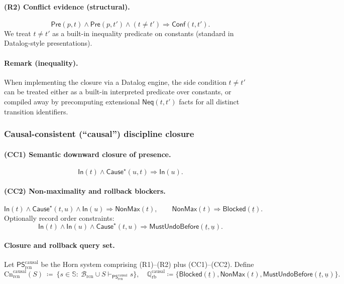 \documentclass[twoside]{article}
\newcommand{\Cn}{\mathrm{Cn}}
\newcommand{\1}{\mathbf{1}}
\begin{document}
\paragraph{(R2) Conflict evidence (structural).}
\[
\mathsf{Pre}(p,t)\wedge \mathsf{Pre}(p,t')\wedge (t\neq t')\Rightarrow \mathsf{Conf}(t,t').
\]
We treat \(t\neq t'\) as a built-in inequality predicate on constants (standard in Datalog-style presentations).

\paragraph{Remark (inequality).}
When implementing the closure via a Datalog engine, the side condition \(t\neq t'\) can be treated either as a built-in interpreted predicate
over constants, or compiled away by precomputing extensional \(\mathsf{Neq}(t,t')\) facts for all distinct transition identifiers.

\subsubsection{Causal-consistent (``causal'') discipline closure}
\label{sec:rcn-causal-closure}

\paragraph{(CC1) Semantic downward closure of presence.}
\[
\mathsf{In}(t)\wedge \mathsf{Cause}^\star(u,t)\Rightarrow \mathsf{In}(u).
\]

\paragraph{(CC2) Non-maximality and rollback blockers.}
\[
\mathsf{In}(t)\wedge \mathsf{Cause}^\star(t,u)\wedge \mathsf{In}(u)\Rightarrow \mathsf{NonMax}(t),
\qquad
\mathsf{NonMax}(t)\Rightarrow \mathsf{Blocked}(\underline{t}).
\]
Optionally record order constraints:
\[
\mathsf{In}(t)\wedge \mathsf{In}(u)\wedge \mathsf{Cause}^\star(t,u)\Rightarrow
\mathsf{MustUndoBefore}(\underline{t},\underline{u}).
\]

\paragraph{Closure and rollback query set.}
Let \(\mathsf{PS}^{\mathrm{causal}}_{\mathrm{rcn}}\) be the Horn system comprising (R1)--(R2) plus (CC1)--(CC2).
Define
\[
\Cn^{\mathrm{causal}}_{\mathrm{rcn}}(S)\ \coloneqq\ \{s\in\mathbb{S}:\ \mathcal{B}_{\mathrm{rcn}}\cup S\vdash_{\mathsf{PS}^{\mathrm{causal}}_{\mathrm{rcn}}} s\},
\quad
\mathbb{Q}^{\mathrm{causal}}_{\mathrm{rb}}\coloneqq
\{\mathsf{Blocked}(\underline{t}),\mathsf{NonMax}(t),\mathsf{MustUndoBefore}(\underline{t},\underline{u})\}.
\]
\end{document}
